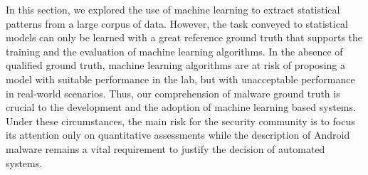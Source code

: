 In this section, we explored the use of machine learning to extract statistical patterns from a large corpus of data.
However, the task conveyed to statistical models can only be learned with a great reference ground truth that supports the training and the evaluation of machine learning algorithms.
In the absence of qualified ground truth, machine learning algorithms are at risk of proposing a model with suitable performance in the lab, but with unacceptable performance in real-world scenarios.
Thus, our comprehension of malware ground truth is crucial to the development and the adoption of machine learning based systems.
Under these circumstances, the main risk for the security community is to focus its attention only on quantitative assessments while the description of Android malware remains a vital requirement to justify the decision of automated systems.
